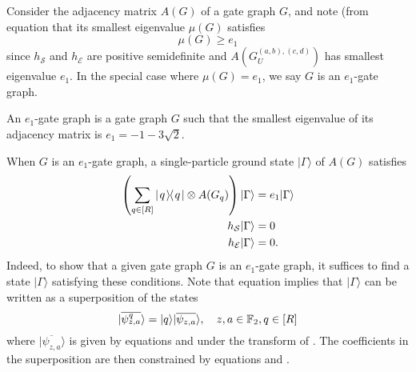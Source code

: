 \documentclass[../thesis-main/thesis-main]{subfiles}
\begin{document}
Consider the adjacency matrix $A(G)$ of a gate graph $G$, and note (from equation  that its smallest eigenvalue $\mu(G)$ satisfies
\begin{equation}
\mu(G)\geq e_{1}
\end{equation}
since $h_{\mathcal{S}}$ and $h_{\mathcal{E}}$ are positive semidefinite and $A(G_{U}^{(a,b),(c,d)})$ has smallest eigenvalue $e_{1}$. In the special case where $\mu(G)=e_{1}$, we say $G$ is an $e_{1}$-gate graph.

\begin{definition}
An $e_{1}$-gate graph is a gate graph $G$ such that the smallest eigenvalue of its adjacency matrix is $e_{1}=-1-3\sqrt{2}$.
\end{definition}

When $G$ is an $e_{1}$-gate graph, a single-particle ground state $|\Gamma\rangle$ of $A(G)$ satisfies 
\begin{align}
\left(\sum_{q\in [R]} |\mspace{2mu} q \mspace{2mu} \rangle\mspace{-2mu}\langle\mspace{2mu} q \mspace{2mu} | \otimes A(G_q)\right)|\Gamma\rangle & =e_{1}|\Gamma\rangle\label{eq:Gamma_disc}\\
h_{\mathcal{S}}|\Gamma\rangle & =0\label{eq:h_s_0}\\
h_{\mathcal{E}}|\Gamma\rangle & =0.\label{eq:h_e_0}
\end{align}
Indeed, to show that a given gate graph $G$ is an $e_{1}$-gate graph, it suffices to find a state $|\Gamma\rangle$ satisfying these conditions. Note that equation  implies that $|\Gamma\rangle$ can be written as a superposition of the states
\begin{equation}
  |\overline{\psi_{z,a}^{q}}\rangle=|q\rangle|\overline{\psi_{z,a}}\rangle,\quad
  z,a\in \mathbb{F}_2, q\in[R]
\end{equation}
where $|\overline{\psi_{z,a}}\rangle$ is given by equations  and  under the transform of . The coefficients in the superposition are then constrained by equations  and .



%
%
\end{document}
